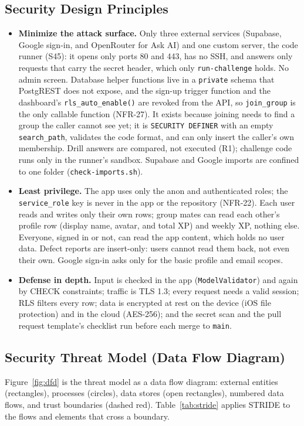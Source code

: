 \documentclass[12pt,letterpaper]{article}
\begin{document}
\subsection{Security Design Principles}
\begin{itemize}
  \item \textbf{Minimize the attack surface.} Only three external services (Supabase,
        Google sign-in, and OpenRouter for Ask AI) and one custom server, the code runner (S45):
        it opens only ports 80 and 443, has no SSH, and answers only requests that carry the
        secret header, which only \texttt{run-challenge} holds. No admin screen. Database helper
        functions live in a \texttt{private} schema that PostgREST does not expose,
        and the sign-up trigger function and the dashboard's
        \texttt{rls\_auto\_enable()} are revoked from the API, so \texttt{join\_group}
        is the only callable function (NFR-27). It exists because joining needs to find
        a group the caller cannot see yet; it is \texttt{SECURITY DEFINER} with an
        empty \texttt{search\_path}, validates the code format, and can only insert
        the caller's own membership. Drill answers are compared, not executed
        (R1); challenge code runs only in the runner's sandbox. Supabase and Google imports are confined to one folder
        (\texttt{check-imports.sh}).
  \item \textbf{Least privilege.} The app uses only the anon and authenticated roles;
        the \texttt{service\_role} key is never in the app or the repository (NFR-22).
        Each user reads and writes only their own rows; group mates can read each
        other's profile row (display name, avatar, and total XP) and weekly XP,
        nothing else. Everyone, signed in or not, can read the app content, which holds
        no user data. Defect reports are
        insert-only: users cannot read them back, not even their own. Google sign-in
        asks only for the basic profile and email scopes.
  \item \textbf{Defense in depth.} Input is checked in the app (\texttt{ModelValidator})
        and again by CHECK constraints; traffic is TLS 1.3; every request needs a valid
        session; RLS filters every row; data is encrypted at rest on the device (iOS
        file protection) and in the cloud (AES-256); and the secret scan and the pull
        request template's checklist run before each merge to \texttt{main}.
\end{itemize}

\subsection{Security Threat Model (Data Flow Diagram)}
Figure~\ref{fig:dfd} is the threat model as a data flow diagram: external entities
(rectangles), processes (circles), data stores (open rectangles), numbered data flows,
and trust boundaries (dashed red). Table~\ref{tab:stride} applies STRIDE to the flows
and elements that cross a boundary.
\end{document}
